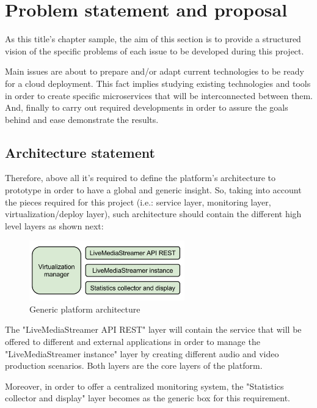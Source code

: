 \chapter{Problem statement and proposal}\label{B:problemStatementAndProposal}

As this title's chapter sample, the aim of this section is to provide a structured vision of the specific problems of each issue to be developed during this project.

Main issues are about to prepare and/or adapt current technologies to be ready for a cloud deployment. This fact implies studying existing technologies and tools in order to create specific microservices that will be interconnected between them. And, finally to carry out required developments in order to assure the goals behind and ease demonstrate the results.

\section{Architecture statement}

Therefore, above all it's required to define the platform's architecture to prototype in order to have a global and generic insight. So, taking into account the pieces required for this project (i.e.: service layer, monitoring layer, virtualization/deploy layer), such architecture should contain the different high level layers as shown next:
\begin{figure}[htb]
\begin{center}
\includegraphics[width=0.6\textwidth]{./images/generalArch.png}
\caption{Generic platform architecture}
\label{F:genericPlatArch}
\end{center}
\end{figure}

The "LiveMediaStreamer API REST" layer will contain the service that will be offered to different and external applications in order to manage the "LiveMediaStreamer instance" layer by creating different audio and video production scenarios. Both layers are the core layers of the platform.

Moreover, in order to offer a centralized monitoring system, the "Statistics collector and display" layer becomes as the generic box for this requirement.

